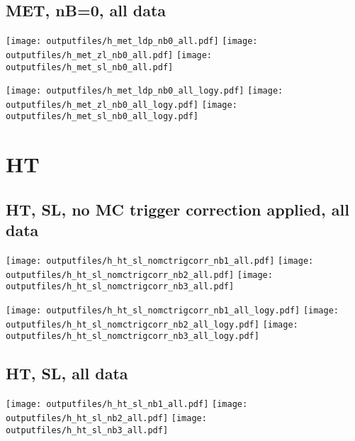 \documentclass[11pt]{article}
\begin{document}
    \subsection{ MET, nB=0, all data}

    \noindent
    \texttt{[image: outputfiles/h\_met\_ldp\_nb0\_all.pdf]}
    \texttt{[image: outputfiles/h\_met\_zl\_nb0\_all.pdf]}
    \texttt{[image: outputfiles/h\_met\_sl\_nb0\_all.pdf]}

    \noindent
    \texttt{[image: outputfiles/h\_met\_ldp\_nb0\_all\_logy.pdf]}
    \texttt{[image: outputfiles/h\_met\_zl\_nb0\_all\_logy.pdf]}
    \texttt{[image: outputfiles/h\_met\_sl\_nb0\_all\_logy.pdf]}









   \section{HT}
     \subsection{ HT, SL, no MC trigger correction applied, all data}

    \noindent
     \texttt{[image: outputfiles/h\_ht\_sl\_nomctrigcorr\_nb1\_all.pdf]}
     \texttt{[image: outputfiles/h\_ht\_sl\_nomctrigcorr\_nb2\_all.pdf]}
     \texttt{[image: outputfiles/h\_ht\_sl\_nomctrigcorr\_nb3\_all.pdf]}

    \noindent
     \texttt{[image: outputfiles/h\_ht\_sl\_nomctrigcorr\_nb1\_all\_logy.pdf]}
     \texttt{[image: outputfiles/h\_ht\_sl\_nomctrigcorr\_nb2\_all\_logy.pdf]}
     \texttt{[image: outputfiles/h\_ht\_sl\_nomctrigcorr\_nb3\_all\_logy.pdf]}



    \subsection{ HT, SL, all data}

    \noindent
     \texttt{[image: outputfiles/h\_ht\_sl\_nb1\_all.pdf]}
     \texttt{[image: outputfiles/h\_ht\_sl\_nb2\_all.pdf]}
     \texttt{[image: outputfiles/h\_ht\_sl\_nb3\_all.pdf]}
\end{document}
